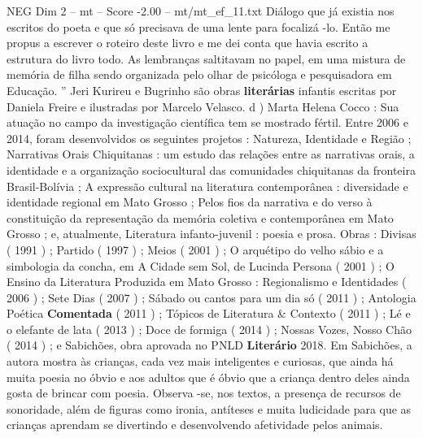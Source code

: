 \begin{textsample}{NEG Dim 2 – mt – Score -2.00 – mt/mt\_ef\_11.txt}
Diálogo que já existia nos escritos do poeta e que só precisava de uma lente para focalizá -lo.
Então me propus a escrever o roteiro deste livro e me dei conta que havia escrito a estrutura do livro todo.
As lembranças saltitavam no papel, em uma mistura de memória de filha sendo organizada pelo olhar de psicóloga e pesquisadora em Educação. ” Jeri Kurireu e Bugrinho são obras \textbf{literárias} infantis escritas por Daniela Freire e ilustradas por Marcelo Velasco. d ) Marta Helena Cocco : Sua atuação no campo da investigação científica tem se mostrado fértil.
Entre 2006 e 2014, foram desenvolvidos os seguintes projetos : Natureza, Identidade e Região ; Narrativas Orais Chiquitanas : um estudo das relações entre as narrativas orais, a identidade e a organização sociocultural das comunidades chiquitanas da fronteira Brasil-Bolívia ; A expressão cultural na literatura contemporânea : diversidade e identidade regional em Mato Grosso ; Pelos fios da narrativa e do verso à constituição da representação da memória coletiva e contemporânea em Mato Grosso ; e, atualmente, Literatura infanto-juvenil : poesia e prosa.
Obras : Divisas ( 1991 ) ; Partido ( 1997 ) ; Meios ( 2001 ) ; O arquétipo do velho sábio e a simbologia da concha, em A Cidade sem Sol, de Lucinda Persona ( 2001 ) ; O Ensino da Literatura Produzida em Mato Grosso : Regionalismo e Identidades ( 2006 ) ; Sete Dias ( 2007 ) ; Sábado ou cantos para um dia só ( 2011 ) ; Antologia Poética \textbf{Comentada} ( 2011 ) ; Tópicos de Literatura \& Contexto ( 2011 ) ; Lé e o elefante de lata ( 2013 ) ; Doce de formiga ( 2014 ) ; Nossas Vozes, Nosso Chão ( 2014 ) ; e Sabichões, obra aprovada no PNLD \textbf{Literário} 2018.
Em Sabichões, a autora mostra às crianças, cada vez mais inteligentes e curiosas, que ainda há muita poesia no óbvio e aos adultos que é óbvio que a criança dentro deles ainda gosta de brincar com poesia.
Observa -se, nos textos, a presença de recursos de sonoridade, além de figuras como ironia, antíteses e muita ludicidade para que as crianças aprendam se divertindo e desenvolvendo afetividade pelos animais.

\end{textsample}
